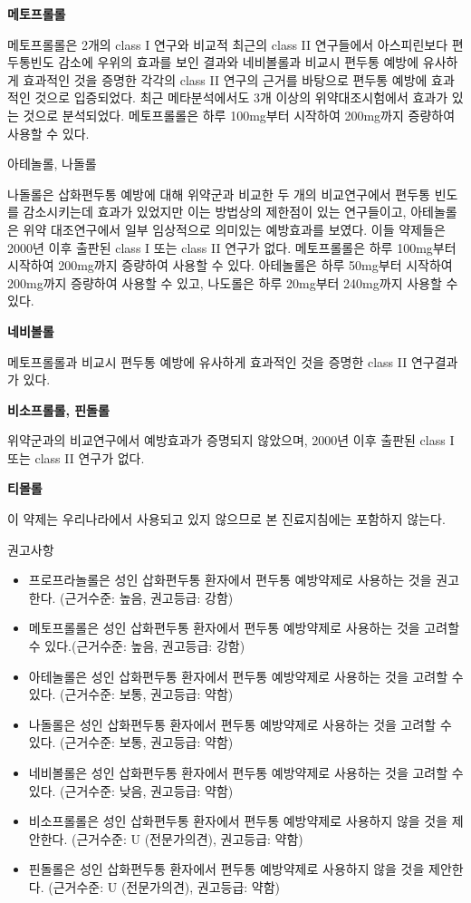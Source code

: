 \documentclass[]{book}
\begin{document}
\textbf{메토프롤롤}

메토프롤롤은 2개의 class I 연구와 비교적 최근의 class II 연구들에서 아스피린보다 편두통빈도 감소에 우위의 효과를 보인 결과와 네비볼롤과 비교시 편두통 예방에 유사하게 효과적인 것을 증명한 각각의 class II 연구의 근거를 바탕으로 편두통 예방에 효과적인 것으로 입증되었다. 최근 메타분석에서도 3개 이상의 위약대조시험에서 효과가 있는 것으로 분석되었다. 메토프롤롤은 하루 100mg부터 시작하여 200mg까지 증량하여 사용할 수 있다.

아테놀롤, 나돌롤

나돌롤은 삽화편두통 예방에 대해 위약군과 비교한 두 개의 비교연구에서 편두통 빈도를 감소시키는데 효과가 있었지만 이는 방법상의 제한점이 있는 연구들이고, 아테놀롤은 위약 대조연구에서 일부 임상적으로 의미있는 예방효과를 보였다. 이들 약제들은 2000년 이후 출판된 class I 또는 class II 연구가 없다. 메토프롤롤은 하루 100mg부터 시작하여 200mg까지 증량하여 사용할 수 있다. 아테놀롤은 하루 50mg부터 시작하여 200mg까지 증량하여 사용할 수 있고, 나도롤은 하루 20mg부터 240mg까지 사용할 수 있다.

\textbf{네비볼롤}

메토프롤롤과 비교시 편두통 예방에 유사하게 효과적인 것을 증명한 class II 연구결과가 있다.

\textbf{비소프롤롤, 핀돌롤}

위약군과의 비교연구에서 예방효과가 증명되지 않았으며, 2000년 이후 출판된 class I 또는 class II 연구가 없다.

\textbf{티몰롤}

이 약제는 우리나라에서 사용되고 있지 않으므로 본 진료지침에는 포함하지 않는다.

권고사항

\begin{itemize}
\item
  프로프라놀롤은 성인 삽화편두통 환자에서 편두통 예방약제로 사용하는 것을 권고한다. (근거수준: 높음, 권고등급: 강함)
\item
  메토프롤롤은 성인 삽화편두통 환자에서 편두통 예방약제로 사용하는 것을 고려할 수 있다.(근거수준: 높음, 권고등급: 강함)
\item
  아테놀롤은 성인 삽화편두통 환자에서 편두통 예방약제로 사용하는 것을 고려할 수 있다. (근거수준: 보통, 권고등급: 약함)
\item
  나돌롤은 성인 삽화편두통 환자에서 편두통 예방약제로 사용하는 것을 고려할 수 있다. (근거수준: 보통, 권고등급: 약함)
\item
  네비볼롤은 성인 삽화편두통 환자에서 편두통 예방약제로 사용하는 것을 고려할 수 있다. (근거수준: 낮음, 권고등급: 약함)
\item
  비소프롤롤은 성인 삽화편두통 환자에서 편두통 예방약제로 사용하지 않을 것을 제안한다. (근거수준: U (전문가의견), 권고등급: 약함)
\item
  핀돌롤은 성인 삽화편두통 환자에서 편두통 예방약제로 사용하지 않을 것을 제안한다. (근거수준: U (전문가의견), 권고등급: 약함)
\end{itemize}
\end{document}
